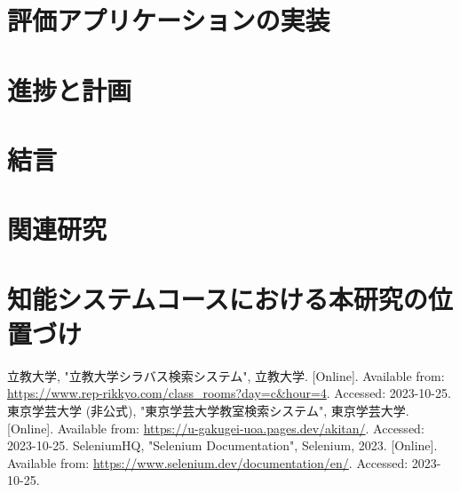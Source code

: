 \documentclass[11pt]{ujarticle}
\begin{document}
\section{評価アプリケーションの実装}


\section{進捗と計画}


\section{結言}


\section{関連研究}


\section{知能システムコースにおける本研究の位置づけ}


\begin{thebibliography}{99}
	立教大学, "立教大学シラバス検索システム", 立教大学. [Online]. Available from: \url{https://www.rep-rikkyo.com/class_rooms?day=c&hour=4}. Accessed: 2023-10-25.
	東京学芸大学 (非公式), "東京学芸大学教室検索システム", 東京学芸大学. [Online]. Available from: \url{https://u-gakugei-uoa.pages.dev/akitan/}. Accessed: 2023-10-25.
	SeleniumHQ, "Selenium Documentation", Selenium, 2023. [Online]. Available from: \url{https://www.selenium.dev/documentation/en/}. Accessed: 2023-10-25.
\end{thebibliography}
\end{document}
